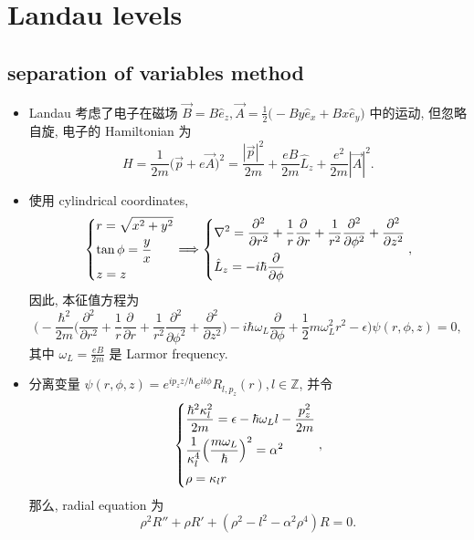 \chapter{Landau levels} \label{A}
\section{separation of variables method}
\begin{itemize}
	\item Landau 考虑了电子在磁场 $\vec{B} = B \hat{e}_z, \vec{A} = \frac{1}{2} \big( - B y \hat{e}_x + B x \hat{e}_y \big)$ 中的运动, 但忽略自旋, 电子的 Hamiltonian 为
	\begin{equation}
		H = \frac{1}{2 m} \Big( \vec{p} + e \vec{A} \Big)^2 = \frac{|\vec{p}|^2}{2 m} + \frac{e B}{2 m} \hat{L}_z + \frac{e^2}{2 m} |\vec{A}|^2.
	\end{equation}
	
	\item 使用 cylindrical coordinates,
	\begin{equation}
		\begin{dcases}
			r = \sqrt{x^2 + y^2} \\
			\tan \phi = \frac{y}{x} \\
			z = z
		\end{dcases} \Longrightarrow \begin{dcases}
			\nabla^2 = \frac{\partial^2}{\partial r^2} + \frac{1}{r} \frac{\partial}{\partial r} + \frac{1}{r^2} \frac{\partial^2}{\partial \phi^2} + \frac{\partial^2}{\partial z^2} \\
			\hat{L}_z = - i \hbar \frac{\partial}{\partial \phi}
		\end{dcases},
	\end{equation}
	因此, 本征值方程为
	\begin{equation}
		\Big( - \frac{\hbar^2}{2 m} \Big( \frac{\partial^2}{\partial r^2} + \frac{1}{r} \frac{\partial}{\partial r} + \frac{1}{r^2} \frac{\partial^2}{\partial \phi^2} + \frac{\partial^2}{\partial z^2} \Big) - i \hbar \omega_L \frac{\partial}{\partial \phi} + \frac{1}{2} m \omega_L^2 r^2 - \epsilon \Big) \psi(r, \phi, z) = 0,
	\end{equation}
	其中 $\omega_L = \frac{e B}{2 m}$	是 Larmor frequency.
	
	\item 分离变量 $\psi(r, \phi, z) = e^{i p_z z / \hbar} e^{i l \phi} R_{l, p_z}(r), l \in \mathbb{Z}$, 并令
	\begin{equation}
		\begin{dcases}
			\frac{\hbar^2 \kappa_l^2}{2 m} = \epsilon - \hbar \omega_L l - \frac{p_z^2}{2 m} \\
			\frac{1}{\kappa_l^4} \Big( \frac{m \omega_L}{\hbar} \Big)^2 = \alpha^2 \\
			\rho = \kappa_l r \\
		\end{dcases},
	\end{equation}
	那么, radial equation 为
	\begin{equation}
		\rho^2 R'' + \rho R' + (\rho^2 - l^2 - \alpha^2 \rho^4) R = 0.
	\end{equation}
\end{itemize}

